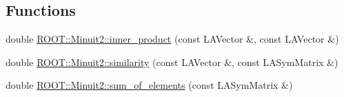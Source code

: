\subsection*{Functions}
\begin{DoxyCompactItemize}
\item 
double \mbox{\hyperlink{namespaceROOT_1_1Minuit2_ac47f2faa5fce723ec08365b174b5035d}{R\+O\+O\+T\+::\+Minuit2\+::inner\+\_\+product}} (const L\+A\+Vector \&, const L\+A\+Vector \&)
\item 
double \mbox{\hyperlink{namespaceROOT_1_1Minuit2_aa54e0f1ba5ca00da1b32710322034fee}{R\+O\+O\+T\+::\+Minuit2\+::similarity}} (const L\+A\+Vector \&, const L\+A\+Sym\+Matrix \&)
\item 
double \mbox{\hyperlink{namespaceROOT_1_1Minuit2_a9beed1d87603a5fd4c04f65e1f7b7cf7}{R\+O\+O\+T\+::\+Minuit2\+::sum\+\_\+of\+\_\+elements}} (const L\+A\+Sym\+Matrix \&)
\end{DoxyCompactItemize}
